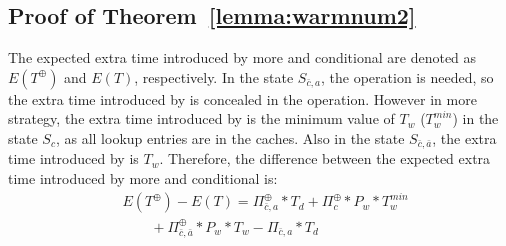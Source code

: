 \subsection{Proof of Theorem~\ref{lemma:warmnum2}}
\label{appendixa2}
The expected extra time introduced by more {\vwarm} and conditional {\vwarm}  are denoted as $E(T^{\oplus})$ and $E(T)$, respectively.
In the state $S_{\bar{c}, a}$, the {\vdelay} operation is needed,
so the extra time introduced by {\vwarm} is concealed in the {\vdelay} operation.
 However in more {\vwarm} strategy,
the extra time introduced by {\vwarm} is the minimum value of $T_{w}$ ($T_{w}^{min}$) in the state $S_{c}$, as all lookup entries are in the caches.
  Also in the state $S_{\bar{c}, \bar{a}}$, the extra time introduced by {\vwarm} is $T_{w}$.
Therefore, the difference between the expected extra time introduced by more {\vwarm} and conditional {\vwarm} is:
\begin{align}
&E(T^{\oplus})-E(T)=\Pi_{\bar{c}, a}^{\oplus} * T_{d} + \Pi_{c}^{\oplus}*P_{w}*T_{w}^{min} \nonumber \\
 &\ \ \ \ \ \ \ \ \ + \Pi_{\bar{c}, \bar{a}}^{\oplus}*P_{w}*T_{w} - \Pi_{\bar{c}, a} * T_{d}
\end{align}

